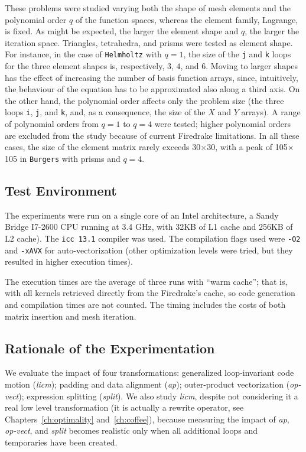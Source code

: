These problems were studied varying both the shape of mesh elements and the polynomial order $q$ of the function spaces, whereas the element family, Lagrange, is fixed. As might be expected, the larger the element shape and $q$, the larger the iteration space. Triangles, tetrahedra, and prisms were tested as element shape. For instance, in the case of {\tt Helmholtz} with $q=1$, the size of the \texttt{j} and \texttt{k} loops for the three element shapes is, respectively, $3$, $4$, and $6$. Moving to larger shapes has the effect of increasing the number of basis function arrays, since, intuitively, the behaviour of the equation has to be approximated also along a third axis. On the other hand, the polynomial order affects only the problem size (the three loops \texttt{i}, \texttt{j}, and \texttt{k}, and, as a consequence, the size of the $X$ and $Y$ arrays). A range of polynomial orders from $q=1$ to $q=4$ were tested; higher polynomial orders are excluded from the study because of current Firedrake limitations. In all these cases, the size of the element matrix rarely exceeds 30$\times$30, with a peak of 105$\times$105 in {\tt Burgers} with prisms and $q=4$.

\subsection{Test Environment}
The experiments were run on a single core of an Intel architecture, a Sandy Bridge I7-2600 CPU running at 3.4 GHz, with 32KB of L1 cache and 256KB of L2 cache). The \texttt{icc 13.1} compiler was used. The compilation flags used were \texttt{-O2} and \texttt{-xAVX} for auto-vectorization (other optimization levels were tried, but they resulted in higher execution times). 

The execution times are the average of three runs with ``warm cache''; that is, with all kernels retrieved directly from the Firedrake's cache, so code generation and compilation times are not counted. The timing includes the costs of both matrix insertion and mesh iteration. 

\subsection{Rationale of the Experimentation}
We evaluate the impact of four transformations: generalized loop-invariant code motion (\emph{licm}); padding and data alignment (\emph{ap}); outer-product vectorization (\emph{op-vect}); expression splitting (\emph{split}). We also study \emph{licm}, despite not considering it a real low level transformation (it is actually a rewrite operator, see Chapters~\ref{ch:optimality} and~\ref{ch:coffee}), because measuring the impact of \emph{ap}, \emph{op-vect}, and \emph{split} becomes realistic only when all additional loops and temporaries have been created.

